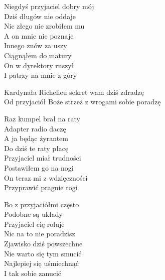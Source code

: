 \begin{text}
    Niegdyś przyjaciel dobry mój\\
    Dziś długów nie oddaje\\
    Nic złego nie zrobiłem mu\\
    A on mnie nie poznaje\\
    \vin Innego znów za uszy\\
    \vin Ciągnąłem do matury\\
    \vin On w dyrektory ruszył\\
    \vin I patrzy na mnie z góry

    Kardynała Richelieu sekret wam dziś zdradzę\\
    Od przyjaciół Boże strzeż z wrogami sobie poradzę

    Raz kumpel brał na raty\\
    Adapter radio daczę\\
    A ja będąc żyrantem\\
    Do dziś te raty płacę\\
    \vin Przyjaciel miał trudności\\
    \vin Postawiłem go na nogi\\
    \vin On teraz mi z wdzięczności\\
    \vin Przyprawić pragnie rogi

    Bo z przyjaciółmi często\\
    Podobne są układy\\
    Przyjaciel cię roluje\\
    Nic na to nie poradzisz\\
    \vin Zjawisko dziś powszechne\\
    \vin Nie warto się tym smucić\\
    \vin Najlepiej się uśmiechnąć\\
    \vin I tak sobie zanucić
\end{text}
\begin{chord}

\end{chord}